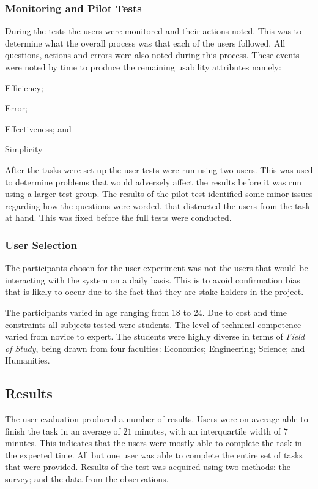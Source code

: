 \documentclass[12pt,a4paper]{report}
\begin{document}
\subsubsection{Monitoring and Pilot Tests}
During the tests the users were monitored and their actions noted. This was to
determine what the overall process was that each of the users followed. All
questions, actions and errors were also noted during this process. These events
were noted by time to produce the remaining usability attributes namely:
\begin{inparaenum}[(i)]\item Efficiency; \item Error; \item Effectiveness; and \item
Simplicity  \end{inparaenum}

After the tasks were set up the user tests were run using two users. This was
used to determine problems that would adversely affect the results before it was
run using a larger test group. The results of the pilot test identified some
minor issues regarding how the questions were worded, that distracted the users
from the task at hand. This was fixed before the full tests were conducted.

\subsubsection{User Selection}
The participants chosen for the user experiment was not the users that would
be interacting with the system on a daily basis. This is to avoid confirmation
bias that is likely to occur due to the fact that they are stake holders in the
project\cite{kaptchuk2003effect}.

The participants varied in age ranging from 18 to 24. Due to cost and time
constraints all subjects tested were students. The level of
technical competence varied from novice to expert. The students were highly
diverse in terms of \emph{Field of Study}, being drawn from four faculties:
Economics; Engineering; Science; and Humanities.

\subsection{Results}
The user evaluation produced a number of results. Users were on average able to
finish the task in an average of $21$ minutes, with an interquartile width of
$7$ minutes. This indicates that the users were mostly able to complete the task
in the expected time. All but one user was able to complete the
entire set of tasks that were provided. Results of the test was acquired using two
methods: the survey; and the data from the observations.
\end{document}
